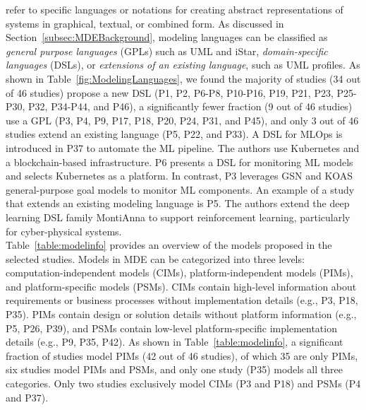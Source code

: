  refer to specific languages or notations for creating abstract representations of systems in graphical, textual, or combined form. As discussed in Section~\ref{subsec:MDEBackground}, modeling languages can be classified as \textit{general purpose languages} (GPLs) such as UML and iStar, \textit{domain-specific languages} (DSLs), or \textit{extensions of an existing language}, such as UML profiles. As shown in Table~\ref{fig:ModelingLanguages}, we found the majority of studies (34 out of 46 studies) propose a new DSL (P1, P2, P6-P8, P10-P16, P19, P21, P23, P25-P30, P32, P34-P44, and P46), a significantly fewer fraction (9 out of 46 studies) use a GPL (P3, P4, P9, P17, P18, P20, P24, P31, and P45), and only 3 out of 46 studies extend an existing language (P5, P22, and P33). A DSL for MLOps is introduced in P37 to automate the ML pipeline. The authors use Kubernetes and a blockchain-based infrastructure. P6 presents a DSL for monitoring ML models and selects Kubernetes as a platform.  In contrast, P3 leverages GSN and KOAS general-purpose goal models to monitor ML components. An example of a study that extends an existing modeling language is P5. The authors extend the deep learning DSL family MontiAnna to support reinforcement learning, particularly for cyber-physical systems. \\

 Table~\ref{table:modelinfo} provides an overview of the models proposed in the selected studies. Models in MDE can be categorized into three levels: computation-independent models (CIMs), platform-independent models (PIMs), and platform-specific models (PSMs). CIMs contain high-level information about requirements or business processes without implementation details (e.g., P3, P18, P35). PIMs contain design or solution details without platform information (e.g., P5, P26, P39), and PSMs contain low-level platform-specific implementation details (e.g., P9, P35, P42). As shown in Table~\ref{table:modelinfo}, a significant fraction of studies model PIMs (42 out of 46 studies), of which 35 are only PIMs, six studies model PIMs and PSMs, and only one study (P35) models all three categories. Only two studies exclusively model CIMs (P3 and P18) and PSMs (P4 and P37).


